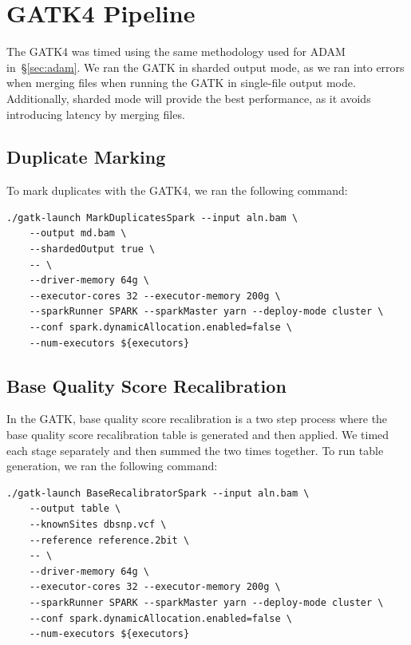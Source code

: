 \documentclass[phd]{ucbthesis}
\begin{document}
\section{GATK4 Pipeline}
\label{sec:gatk4}

The GATK4 was timed using the same methodology used for ADAM in~\S\ref{sec:adam}.
We ran the GATK in sharded output mode, as we ran into errors when merging files
when running the GATK in single-file output mode. Additionally, sharded mode will
provide the best performance, as it avoids introducing latency by merging files.

\subsection{Duplicate Marking}
\label{sec:gatk-dm}

To mark duplicates with the GATK4, we ran the following command:

\begin{lstlisting}[caption=GATK4 Duplicate Marking Command]
./gatk-launch MarkDuplicatesSpark --input aln.bam \
    --output md.bam \
    --shardedOutput true \
    -- \
    --driver-memory 64g \
    --executor-cores 32 --executor-memory 200g \
    --sparkRunner SPARK --sparkMaster yarn --deploy-mode cluster \
    --conf spark.dynamicAllocation.enabled=false \
    --num-executors ${executors}
\end{lstlisting}

\subsection{Base Quality Score Recalibration}
\label{sec:gatk-bqsr}

In the GATK, base quality score recalibration is a two step process where the
base quality score recalibration table is generated and then applied. We timed
each stage separately and then summed the two times together. To run table
generation, we ran the following command:

\begin{lstlisting}[caption=GATK4 BQSR Table Generation Command]
./gatk-launch BaseRecalibratorSpark --input aln.bam \
    --output table \
    --knownSites dbsnp.vcf \
    --reference reference.2bit \
    -- \
    --driver-memory 64g \
    --executor-cores 32 --executor-memory 200g \
    --sparkRunner SPARK --sparkMaster yarn --deploy-mode cluster \
    --conf spark.dynamicAllocation.enabled=false \
    --num-executors ${executors}
\end{lstlisting}
\end{document}
